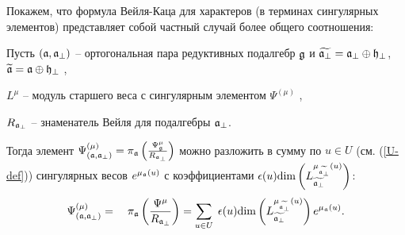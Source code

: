 Покажем, что формула Вейля-Каца для характеров (в терминах сингулярных элементов) представляет собой частный случай более общего соотношения:

\begin{lemma}
\label{lemma}
Пусть $\left( \mathfrak{a},\mathfrak{a}_{\perp} \right)$ -- ортогональная пара редуктивных подалгебр $\mathfrak{g}$ и  $\widetilde{\mathfrak{a}_{\perp}}=\mathfrak{a}_{\perp}\oplus \mathfrak{h}_{\perp }$, $\widetilde{\mathfrak{a}}=\mathfrak{a}\oplus\mathfrak{h}_{\perp }$ ,

$L^{\mu }$ -- модуль старшего веса с сингулярным элементом $\Psi ^{\left(\mu \right)}$ ,

$R_{\mathfrak{a}_{\perp }}$ -- знаменатель Вейля для подалгебры $\mathfrak{a}_{\perp }$.

Тогда элемент  $\Psi ^{\left( \mu \right) }_{\left(  \mathfrak{a}, \mathfrak{a}_{\perp} \right)}=\pi _{\mathfrak{a}}\left( \frac{\Psi _{\mathfrak{g}}^{\mu }}{R_{\mathfrak{a}_{\perp }}}\right) $ можно разложить в сумму по  $u\in U$ (см. (\ref{U-def})) сингулярных весов $e^{\mu _{\mathfrak{a}}\left( u\right) }$ с коэффициентами $\epsilon (u)\mathrm{\dim}\left( L_{\widetilde{\mathfrak{a}_{\perp}}}^{\mu _{\widetilde{\mathfrak{a}_{\perp}}}\left( u\right) }\right) $:
\begin{equation}
\Psi ^{\left( \mu \right) }_{\left(  \af, \afb \right)}=\quad \pi _{\af}\left( \frac{\Psi^{\mu }}{R_{\af%
_{\perp }}}\right) =\sum_{u\in U}\;\epsilon (u)\mathrm{\dim }
\left( L_{\widetilde{\af_{\perp }}}^{\mu _{%
\widetilde{\af_{\perp }}}\left( u\right) }\right) e^{\mu _{\af}\left( u \right) }.
\end{equation}
\end{lemma}

